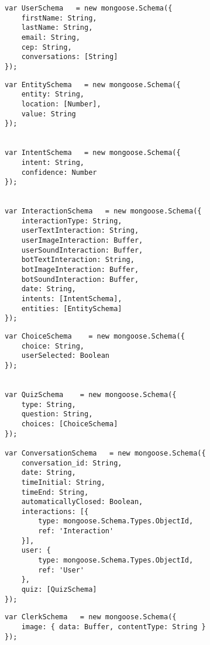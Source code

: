 
\medskip
\begin{lstlisting}[caption= User Collection]
var UserSchema   = new mongoose.Schema({
    firstName: String,
    lastName: String,
    email: String,
    cep: String,
    conversations: [String]
});
\end{lstlisting}

\medskip
\begin{lstlisting}[caption= Interaction Collection]
var EntitySchema   = new mongoose.Schema({
    entity: String,
    location: [Number],
    value: String
});


var IntentSchema   = new mongoose.Schema({
    intent: String,
    confidence: Number
});


var InteractionSchema   = new mongoose.Schema({
    interactionType: String,
    userTextInteraction: String,
    userImageInteraction: Buffer,
    userSoundInteraction: Buffer,
    botTextInteraction: String,
    botImageInteraction: Buffer,
    botSoundInteraction: Buffer,
    date: String,
    intents: [IntentSchema],
    entities: [EntitySchema]
});

\end{lstlisting}

\newpage
\medskip
\begin{lstlisting}[caption= Conversation Collection]
var ChoiceSchema    = new mongoose.Schema({
    choice: String,
    userSelected: Boolean
});


var QuizSchema    = new mongoose.Schema({
    type: String,
    question: String,
    choices: [ChoiceSchema]
});

var ConversationSchema   = new mongoose.Schema({
    conversation_id: String,
    date: String,
    timeInitial: String,
    timeEnd: String,
    automaticallyClosed: Boolean,
    interactions: [{
        type: mongoose.Schema.Types.ObjectId,
        ref: 'Interaction'
    }],
    user: {
        type: mongoose.Schema.Types.ObjectId,
        ref: 'User'
    },
    quiz: [QuizSchema]
});

\end{lstlisting}

\medskip
\begin{lstlisting}[caption= Clerk Collection]
var ClerkSchema   = new mongoose.Schema({
    image: { data: Buffer, contentType: String }
});
\end{lstlisting}